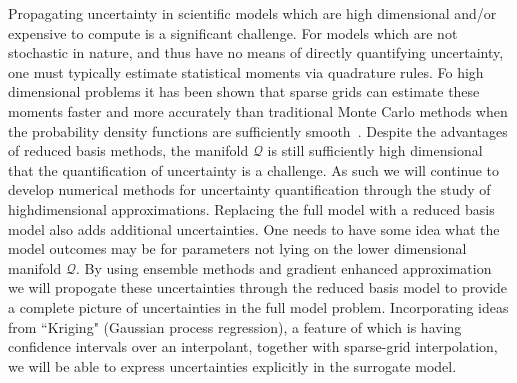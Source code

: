\documentclass[a4paper,fontsize=12pt]{scrartcl}
\begin{document}
Propagating uncertainty in scientific models which are high dimensional 
and/or expensive to compute is a significant challenge.
For models which are not stochastic in nature, and thus have no means
of directly quantifying uncertainty, one must typically estimate statistical 
moments via quadrature rules. Fo high dimensional problems 
it has been shown that sparse grids can estimate these moments faster 
and more accurately than traditional Monte Carlo methods when the 
probability density functions are sufficiently smooth~\parencite{JakemanRoberts2013,FranzelinDiehlPfluger2014}.
Despite the advantages of reduced basis methods, the manifold $\mathcal{Q}$
is still sufficiently high dimensional that the quantification of uncertainty
is a challenge. As such we will continue to develop numerical methods for 
uncertainty quantification through the study of highdimensional approximations.
Replacing the full model with a reduced basis model also adds additional 
uncertainties. One needs to have some idea what the model outcomes may be 
for parameters not lying on the lower dimensional manifold $\mathcal{Q}$.
By using ensemble methods and gradient enhanced 
approximation~\parencite{deBaarHarding2015,Jakeman2015} we will
propogate these uncertainties through the reduced basis model 
to provide a complete picture of uncertainties in the full model problem.
Incorporating ideas from ``Kriging" (Gaussian process regression), a feature of which is having 
confidence intervals over an interpolant, together with sparse-grid interpolation,
we will be able to express uncertainties explicitly in the surrogate model.\\


\\
\end{document}
